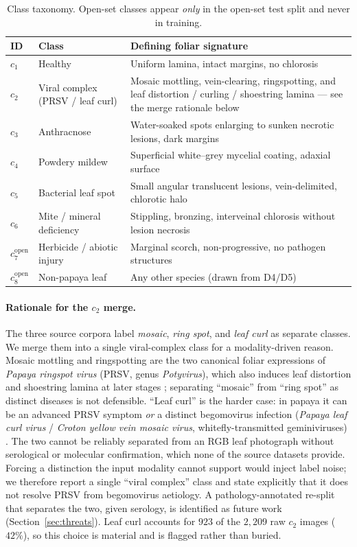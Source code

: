 \documentclass[10pt,twocolumn,a4paper]{article}
\begin{document}
\begin{table}[H]
\centering
\caption{Class taxonomy. Open-set classes appear \emph{only} in the open-set test split and never in training.}
\label{tab:classes}
{\footnotesize
\begin{tabularx}{\columnwidth}{@{}p{0.45cm} p{2.35cm} X@{}}
\toprule
\rowcolor{hdrgray}
ID & Class & Defining foliar signature \\
\midrule
$c_1$ & Healthy & Uniform lamina, intact margins, no chlorosis \\
$c_2$ & Viral complex (PRSV / leaf curl) & Mosaic mottling, vein-clearing, ringspotting, and leaf distortion / curling / shoestring lamina --- see the merge rationale below \\
$c_3$ & Anthracnose & Water-soaked spots enlarging to sunken necrotic lesions, dark margins \\
$c_4$ & Powdery mildew & Superficial white--grey mycelial coating, adaxial surface \\
$c_5$ & Bacterial leaf spot & Small angular translucent lesions, vein-delimited, chlorotic halo \\
$c_6$ & Mite / mineral deficiency & Stippling, bronzing, interveinal chlorosis without lesion necrosis \\
\midrule
$c_7^{\text{open}}$ & Herbicide / abiotic injury & Marginal scorch, non-progressive, no pathogen structures \\
$c_8^{\text{open}}$ & Non-papaya leaf & Any other species (drawn from D4/D5) \\
\bottomrule
\end{tabularx}}
\end{table}

\paragraph{Rationale for the $c_2$ merge.} The three source corpora label \emph{mosaic}, \emph{ring spot}, and \emph{leaf curl} as separate classes. We merge them into a single viral-complex class for a modality-driven reason. Mosaic mottling and ringspotting are the two canonical foliar expressions of \emph{Papaya ringspot virus} (PRSV, genus \emph{Potyvirus}), which also induces leaf distortion and shoestring lamina at later stages \cite{prsv_review}; separating ``mosaic'' from ``ring spot'' as distinct diseases is not defensible. ``Leaf curl'' is the harder case: in papaya it can be an advanced PRSV symptom \emph{or} a distinct begomovirus infection (\emph{Papaya leaf curl virus} / \emph{Croton yellow vein mosaic virus}, whitefly-transmitted geminiviruses) \cite{palcuv}. The two cannot be reliably separated from an RGB leaf photograph without serological or molecular confirmation, which none of the source datasets provide. Forcing a distinction the input modality cannot support would inject label noise; we therefore report a single ``viral complex'' class and state explicitly that it does not resolve PRSV from begomovirus aetiology. A pathology-annotated re-split that separates the two, given serology, is identified as future work (Section~\ref{sec:threats}). Leaf curl accounts for $923$ of the $2{,}209$ raw $c_2$ images ($42\%$), so this choice is material and is flagged rather than buried.
\end{document}
